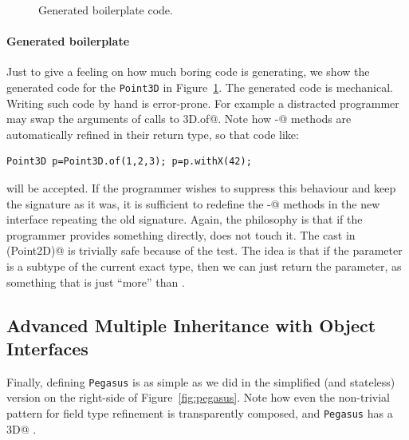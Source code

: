 


\begin{figure}
\caption{Generated boilerplate code.}
\label{fig:boilerplate}
\end{figure}

\paragraph{Generated boilerplate}
Just to give a feeling on how much boring code \mixin is generating, we show the
generated code for the \texttt{Point3D} in Figure~\ref{fig:boilerplate}. The
generated code is mechanical. Writing such code by hand is error-prone. For
example a distracted programmer may swap the arguments of calls to
\Q@Point3D.of@.  Note how \Q@with-@ methods are automatically refined in their
return type, so that code like:

\begin{lstlisting}
Point3D p=Point3D.of(1,2,3); p=p.withX(42);
\end{lstlisting}

\noindent will be accepted. If the programmer wishes to suppress this behaviour
and keep the signature as it was, it is sufficient to redefine the \Q@with-@
methods in the new interface repeating the old signature.  Again, the philosophy
is that if the programmer provides something directly, \mixin does not touch it.
The cast in \Q@with(Point2D)@ is trivially safe because of the \Q@instanceof@
test. The idea is that if the parameter is a subtype of the current exact type,
then we can just return the parameter, as something that is just ``more'' than
\Q@this@.

\subsection{Advanced Multiple Inheritance with Object Interfaces}
Finally, defining \texttt{Pegasus} is as simple as we did in the simplified
(and stateless) version on the right-side of Figure~\ref{fig:pegasus}.
 Note how even the non-trivial pattern for field type refinement is
transparently composed, and \texttt{Pegasus} has a \Q@Point3D@
\Q@location@.%

